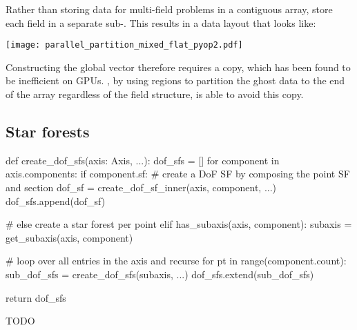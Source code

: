 \documentclass[thesis]{subfiles}
\begin{document}


\begin{pyopcompare}
  Rather than storing data for multi-field problems in a contiguous array,   store each field in a separate sub-.
  This results in a data layout that looks like:

  \begin{center}
    \texttt{[image: parallel\_partition\_mixed\_flat\_pyop2.pdf]}
  \end{center}

  Constructing the global vector therefore requires a copy, which has been found to be inefficient on GPUs.
  , by using regions to partition the ghost data to the end of the array regardless of the field structure, is able to avoid this copy.
\end{pyopcompare}

\subsection{Star forests}
\label{sec:parallel_star_forests}

\begin{algorithm}
  \begin{center}
    \begin{minipage}{.9\textwidth}
      \begin{pyalg2}
        def create_dof_sfs(axis: Axis, ...):
          dof_sfs = []
          for component in axis.components:
            if component.sf:
              # create a DoF SF by composing the point SF and section
              dof_sf = create_dof_sf_inner(axis, component, ...)
              dof_sfs.append(dof_sf)

            # else create a star forest per point
            elif has_subaxis(axis, component):
              subaxis = get_subaxis(axis, component)

              # loop over all entries in the axis and recurse
              for pt in range(component.count):
                sub_dof_sfs = create_dof_sfs(subaxis, ...)
                dof_sfs.extend(sub_dof_sfs)

          return dof_sfs
      \end{pyalg2}
    \end{minipage}
  \end{center}

  \caption{
    TODO
  }
  \label{alg:compose_star_forests}
\end{algorithm}
\end{document}

